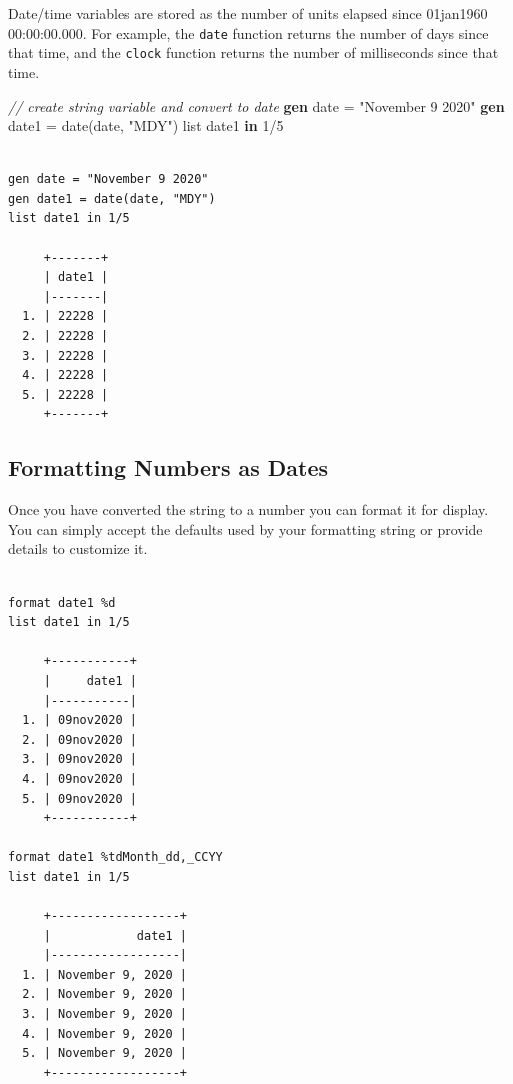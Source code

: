\documentclass[
]{book}
\newenvironment{Shaded}{\begin{snugshade}}{\end{snugshade}}
\newcommand{\CommentTok}[1]{\textcolor[rgb]{0.56,0.35,0.01}{\textit{#1}}}
\newcommand{\FunctionTok}[1]{\textcolor[rgb]{0.00,0.00,0.00}{#1}}
\newcommand{\KeywordTok}[1]{\textcolor[rgb]{0.13,0.29,0.53}{\textbf{#1}}}
\newcommand{\NormalTok}[1]{#1}
\newcommand{\OtherTok}[1]{\textcolor[rgb]{0.56,0.35,0.01}{#1}}
\newcommand{\StringTok}[1]{\textcolor[rgb]{0.31,0.60,0.02}{#1}}
\begin{document}
Date/time variables are stored as the number of units elapsed since 01jan1960 00:00:00.000. For example, the \texttt{date} function returns the number of days since that time, and the \texttt{clock} function returns the number of milliseconds since that time.

\begin{Shaded}
\begin{Highlighting}[]
  \CommentTok{// create string variable and convert to date}
  \KeywordTok{gen} \FunctionTok{date}\NormalTok{ = }\StringTok{"November 9 2020"}
  \KeywordTok{gen}\NormalTok{ date1 = }\FunctionTok{date}\NormalTok{(}\FunctionTok{date}\NormalTok{, }\StringTok{"MDY"}\NormalTok{)}
  \OtherTok{list}\NormalTok{ date1 }\KeywordTok{in}\NormalTok{ 1/5}
\end{Highlighting}
\end{Shaded}

\begin{verbatim}

gen date = "November 9 2020"
gen date1 = date(date, "MDY")
list date1 in 1/5

     +-------+
     | date1 |
     |-------|
  1. | 22228 |
  2. | 22228 |
  3. | 22228 |
  4. | 22228 |
  5. | 22228 |
     +-------+
\end{verbatim}

\hypertarget{formatting-numbers-as-dates}{%
\subsection{Formatting Numbers as Dates}\label{formatting-numbers-as-dates}}

Once you have converted the string to a number you can format it for display. You can simply accept the defaults used by your formatting string or provide details to customize it.

\begin{Shaded}
\end{Shaded}

\begin{verbatim}

format date1 %d
list date1 in 1/5

     +-----------+
     |     date1 |
     |-----------|
  1. | 09nov2020 |
  2. | 09nov2020 |
  3. | 09nov2020 |
  4. | 09nov2020 |
  5. | 09nov2020 |
     +-----------+

format date1 %tdMonth_dd,_CCYY
list date1 in 1/5

     +------------------+
     |            date1 |
     |------------------|
  1. | November 9, 2020 |
  2. | November 9, 2020 |
  3. | November 9, 2020 |
  4. | November 9, 2020 |
  5. | November 9, 2020 |
     +------------------+
\end{verbatim}
\end{document}
